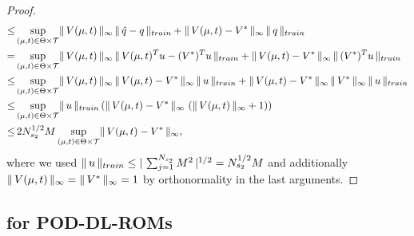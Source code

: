 \begin{proof}
\begin{align*}
        \leq &\sup\limits_{(\mu, t) \in \Theta \times \mathcal{T}}  \lVert \, V(\mu, t) \, \rVert_\infty \, \lVert \, \hat{q} - q \, \rVert_{train} + \lVert \, V(\mu, t) - V^* \, \rVert_\infty \, \lVert \, q \, \rVert_{train} \\
        = &\sup\limits_{(\mu, t) \in \Theta \times \mathcal{T}} \lVert \, V(\mu, t) \, \rVert_\infty \, \lVert \, V(\mu, t)^T u - (V^*)^T u \, \rVert_{train} + \lVert \, V(\mu, t) - V^* \, \rVert_\infty \, \lVert \, (V^*)^T u \, \rVert_{train} \\
        \leq &\sup\limits_{(\mu, t) \in \Theta \times \mathcal{T}} \lVert \, V(\mu, t) \, \rVert_\infty \, \lVert \, V(\mu, t) - V^* \, \rVert_\infty \, \lVert \, u \, \rVert_{train} + \lVert \, V(\mu, t) - V^* \, \rVert_\infty \, \lVert \, V^* \, \rVert_\infty \, \lVert \, u \, \rVert_{train} \\
        \leq &\sup\limits_{(\mu, t) \in \Theta \times \mathcal{T}} \lVert \, u \, \rVert_{train} \left( \lVert \, V(\mu, t) - V^* \, \rVert_\infty \, \left( \lVert \, V(\mu, t) \, \rVert_\infty + 1 \right) \right) \\
        \leq & \, 2 N_{s_2}^{1/2} M \sup\limits_{(\mu, t) \in \Theta \times \mathcal{T}} \lVert \, V(\mu, t) - V^* \, \rVert_\infty,
    \end{align*}
    where we used $\lVert \, u \, \rVert_{train} \leq \vert \, \sum_{j=1}^{N_{s_2}} M^2 \, \vert^{1/2} = N_{s_2}^{1/2} M$ and additionally $\lVert \, V(\mu, t) \, \rVert_\infty = \lVert \, V^* \, \rVert_\infty = 1$
    by orthonormality in the last arguments.


\end{proof}


\subsection{for POD-DL-ROMs}


